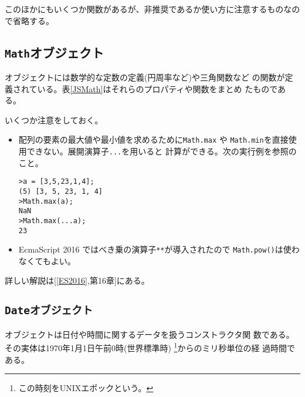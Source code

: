  このほかにもいくつか関数があるが、非推奨であるか使い方に注意するものなので省略する。
 \clearpage
\subsection{\protect\texttt{Math}オブジェクト}
オブジェクトには数学的な定数の定義(円周率など)や三角関数など
の関数が定義されている。表\ref{JSMath}はそれらのプロパティや関数をまとめ
たものである。%

いくつか注意をしておく。
\begin{itemize}
 \item 配列の要素の最大値や最小値を求めるために\Verb+Math.max+ や
       \Verb+Math.min+を直接使用できない。展開演算子\Verb+...+を用いると
       計算ができる。次の実行例を参照のこと。
\begin{Verbatim}
>a = [3,5,23,1,4];
(5) [3, 5, 23, 1, 4]
>Math.max(a);
NaN
>Math.max(...a);
23
\end{Verbatim}
 \item EcmaScript 2016 ではべき乗の演算子\texttt{**}が導入されたので
\texttt{Math.pow()}は使わなくてもよい。
\end{itemize}
詳しい解説は[\ref{ES2016},第16章]にある。
\subsection{\protect\texttt{Dateオブジェクト}}
オブジェクトは日付や時間に関するデータを扱うコンストラクタ関
数である。その実体は1970年1月1日午前0時(世界標準時)
\footnote{この時刻をUNIXエポックという。}からのミリ秒単位の経
過時間である。

